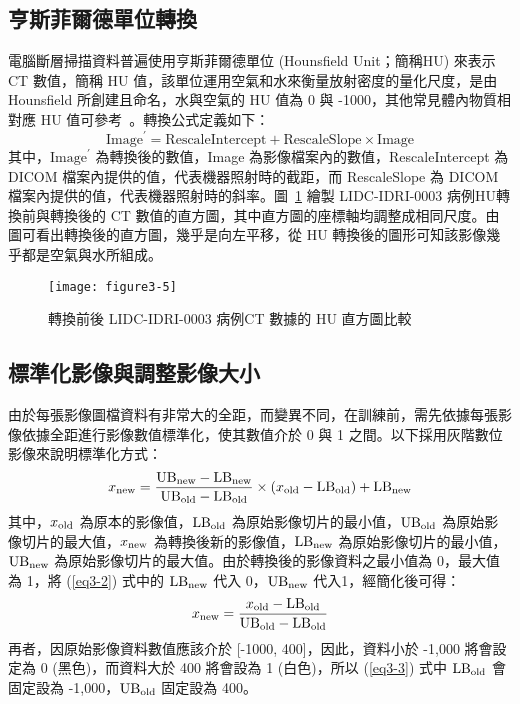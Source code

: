 \documentclass[12pt, a4paper]{article} 				%
\begin{document}
\subsection{亨斯菲爾德單位轉換}
電腦斷層掃描資料普遍使用亨斯菲爾德單位 (Hounsfield Unit；簡稱HU)  來表示 CT 數值，簡稱 HU 值，該單位運用空氣和水來衡量放射密度的量化尺度，是由 Hounsfield 所創建且命名，水與空氣的 HU 值為 0 與 -1000，其他常見體內物質相對應 HU 值可參考~\cite{Chen2019,Chen2018}。轉換公式定義如下：
\begin{equation} 
\mbox{Image}^{'} = \mbox{RescaleIntercept} +\mbox{RescaleSlope}\times \mbox{Image} 	
\end{equation}
其中，$\mbox{Image}^{'}$ 為轉換後的數值，Image 為影像檔案內的數值，RescaleIntercept 為 DICOM 檔案內提供的值，代表機器照射時的截距，而 RescaleSlope 為 DICOM 檔案內提供的值，代表機器照射時的斜率。圖~\ref{Figure3-5} 繪製 LIDC-IDRI-0003 病例HU轉換前與轉換後的 CT 數值的直方圖，其中直方圖的座標軸均調整成相同尺度。由圖可看出轉換後的直方圖，幾乎是向左平移，從 HU 轉換後的圖形可知該影像幾乎都是空氣與水所組成。

\begin{figure}[!ht]
\begin{center}
\texttt{[image: figure3-5]}
\caption{轉換前後 LIDC-IDRI-0003 病例CT 數據的 HU 直方圖比較}\label{Figure3-5}
\end{center}
\end{figure}

\subsection{標準化影像與調整影像大小}
由於每張影像圖檔資料有非常大的全距，而變異不同，在訓練前，需先依據每張影像依據全距進行影像數值標準化，使其數值介於 0 與 1 之間。以下採用灰階數位影像來說明標準化方式：
\begin{align}
x_{\rm new}=
\frac{{\rm UB}_{\rm new}-{\rm LB}_{\rm new}}{{\rm UB}_{\rm old}-{\rm LB}_{\rm old}}\times (x_{\rm old}-{\rm LB}_{\rm old})+{\rm LB}_{\rm new}\label{eq3-2}
\end{align}
其中，$x_{\rm old}$ 為原本的影像值，${\rm LB}_{\rm old}$ 為原始影像切片的最小值，${\rm UB}_{\rm old}$ 為原始影像切片的最大值，$x_{\rm new}$ 為轉換後新的影像值，${\rm LB}_{\rm new}$ 為原始影像切片的最小值，${\rm UB}_{\rm new}$ 為原始影像切片的最大值。由於轉換後的影像資料之最小值為 0，最大值為 1，將 (\ref{eq3-2}) 式中的  ${\rm LB}_{\rm new}$ 代入 0，${\rm UB}_{\rm new}$  代入1，經簡化後可得：
 \begin{equation}
x_{\rm new}=\frac{x_{\rm old}-{\rm LB}_{\rm old}}{{\rm UB}_{\rm old}-{\rm LB}_{\rm old}}\label{eq3-3}
\end{equation}
再者，因原始影像資料數值應該介於 [-1000, 400]，因此，資料小於 -1,000 將會設定為 0 (黑色)，而資料大於 400 將會設為 1 (白色)，所以 (\ref{eq3-3}) 式中  ${\rm LB}_{\rm old}$ 會固定設為 -1,000，${\rm UB}_{\rm old}$ 固定設為 400。
\end{document}
